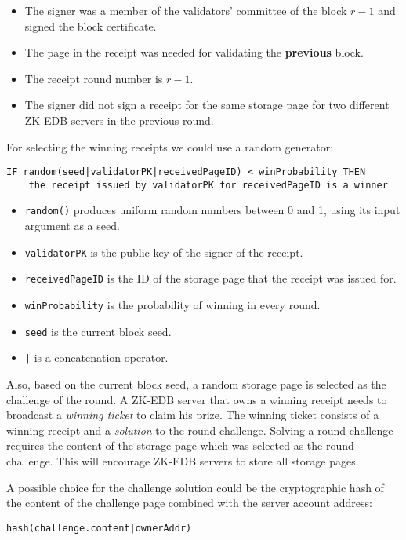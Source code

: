 \begin{itemize}
    \item The signer was a member of the validators' committee of the block $r - 1$ and signed the block certificate.
    \item The page in the receipt was needed for validating the \textbf{previous} block.
    \item The receipt round number is $r - 1$.
    \item The signer did not sign a receipt for the same storage page for two different ZK-EDB servers in
    the previous round.
\end{itemize}
For selecting the winning receipts we could use a random generator:
\begin{verbatim}
IF random(seed|validatorPK|receivedPageID) < winProbability THEN
    the receipt issued by validatorPK for receivedPageID is a winner
\end{verbatim}
\begin{itemize}
    \item \texttt{random()} produces uniform random numbers between 0 and 1, using its input argument as a seed.
    \item \texttt{validatorPK} is the public key of the signer of the receipt.
    \item \texttt{receivedPageID} is the ID of the storage page that the receipt was issued for.
    \item \texttt{winProbability} is the probability of winning in every round.
    \item \texttt{seed} is the current block seed.
    \item \texttt{|} is a concatenation operator.
\end{itemize}

Also, based on the current block seed, a random storage page is
selected as the challenge of the round. A ZK-EDB server that owns a winning receipt needs to broadcast a \emph{winning
ticket} to claim his prize. The winning ticket consists of a winning receipt and a \emph{solution} to the round
challenge. Solving a round challenge requires the content of the storage page which was selected as the round
challenge. This will encourage ZK-EDB servers to store all storage pages.

A possible choice for the challenge solution could be the cryptographic hash of the content of the challenge
page combined with the server account address:

\texttt{hash(challenge.content|ownerAddr)}

